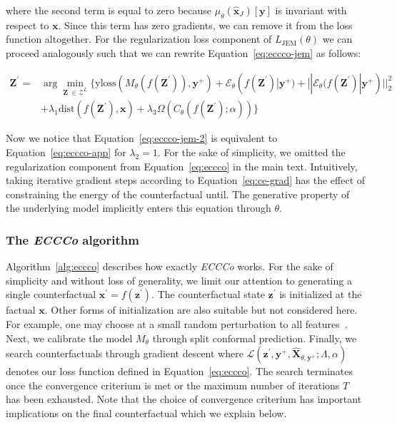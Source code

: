 where the second term is equal to zero because $\mu_{\theta}(\hat{\mathbf{x}}_{J})[\mathbf{y}]$ is invariant with respect to $\mathbf{x}$. Since this term has zero gradients, we can remove it from the loss function altogether. For the regularization loss component of $L_{\text{JEM}}(\theta)$ we can proceed analogously such that we can rewrite Equation~\ref{eq:eccco-jem} as follows:

\begin{equation} \label{eq:eccco-jem-2}
  \begin{aligned}
  \mathbf{Z}^\prime =& \arg \min_{\mathbf{Z}^\prime \in \mathcal{Z}^L} \{  {\text{yloss}(M_{\theta}(f(\mathbf{Z}^\prime)),\mathbf{y}^+) + \mathcal{E}_{\theta}(f(\mathbf{Z}^\prime)|\mathbf{y}^+) + || \mathcal{E}_{\theta}(f(\mathbf{Z}^\prime)|\mathbf{y}^+) ||_2^2} \\ &+ \lambda_{1} {\text{dist}(f(\mathbf{Z}^\prime),\mathbf{x}) }  + \lambda_3 \Omega(C_{\theta}(f(\mathbf{Z}^\prime);\alpha)) \} 
  \end{aligned} 
\end{equation}

Now we notice that Equation~\ref{eq:eccco-jem-2} is equivalent to Equation~\ref{eq:eccco-app} for $\lambda_2=1$. For the sake of simplicity, we omitted the regularization component from Equation~\ref{eq:eccco} in the main text. Intuitively, taking iterative gradient steps according to Equation~\ref{eq:ce-grad} has the effect of constraining the energy of the counterfactual until. The generative property of the underlying model implicitly enters this equation through $\theta$.

\subsubsection{The \textit{ECCCo} algorithm}

Algorithm~\ref{alg:eccco} describes how exactly \textit{ECCCo} works. For the sake of simplicity and without loss of generality, we limit our attention to generating a single counterfactual $\mathbf{x}^\prime=f(\mathbf{z}^\prime)$. The counterfactual state $\mathbf{z}^\prime$ is initialized at the factual $\mathbf{x}$. Other forms of initialization are also suitable but not considered here. For example, one may choose at a small random perturbation to all features~\citep{slack2021counterfactual}. Next, we calibrate the model $M_{\theta}$ through split conformal prediction. Finally, we search counterfactuals through gradient descent where $\mathcal{L}(\mathbf{z}^\prime,\mathbf{y}^+,\widehat{\mathbf{X}}_{\theta,\mathbf{y}^+}; \Lambda, \alpha)$ denotes our loss function defined in Equation~\ref{eq:eccco}. The search terminates once the convergence criterium is met or the maximum number of iterations $T$ has been exhausted. Note that the choice of convergence criterium has important implications on the final counterfactual which we explain below.

